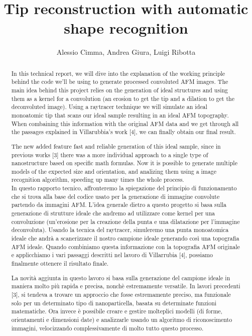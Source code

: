 \documentclass{article}
\author{Alessio Cimma, Andrea Giura, Luigi Ribotta}
\title{Tip reconstruction with automatic shape recognition}
\begin{document}
\maketitle

\newpage
\tableofcontents
\newpage


\begin{abstract}
    In this technical report, we will dive into the explanation of the working principle behind the code we'll be using to generate processed convoluted AFM images. The main idea behind this project relies on the generation of ideal structures and using them as a kernel for a convolution (an erosion to get the tip and a dilation to get the deconvoluted image). Using a raytracer technique we will simulate an ideal monoatomic tip that scans our ideal sample resulting in an ideal AFM topography. When combaining this information with the original AFM data and we get through all the passages explained in Villarubbia's work [4], we can finally obtain our final result.
    
    The new added feature fast and reliable generation of this ideal sample, since in previous works [3] there was a more individual approach to a single type of nanostructure based on specific math formulas. Now it is possible to generate multiple models of the expected size and orientation, and analizing them using a image recognition algorithm, speeding up many times the whole process.
    \\[1cm]
    In questo rapporto tecnico, affronteremo la spiegazione del principio di funzionamento che si trova alla base del codice usato per la generazione di immagine convolute partendo da immagini AFM. L'idea generale dietro a questo progetto si basa sulla generazione di strutture ideale che andremo ad utilizzare come kernel per una convoluzione (un'erosione per la creazione della punta e una dilatazione per l'immagine deconvoluta). Usando la tecnica del raytracer, simuleremo una punta monoatomica ideale che andrà a scanerizzare il nostro campione ideale generando così una topografia AFM ideale. Quando combiniamo questa informazione con la topografia AFM originale e applicchiamo i vari passaggi descritti nel lavoro di Villarrubia [4], possiamo finalmente ottenere il risultato finale.
    
    La novità aggiunta in questo lavoro si basa sulla generazione del campione ideale in maniera molto più rapida e precisa, nonchè estremamente versatile. In lavori precedenti [3], si tendeva a trovare un approccio che fosse estremamente preciso, ma funzionale solo per un determinato tipo di nanoparticella, basata su determinate funzioni matematiche. Ora invece è possibile creare e gestire molteplici modelli (di forme, orientamenti e dimensioni date) e analizzarle usando un algoritmo di riconoscimento immagini, velocizzando complessivamente di molto tutto questo processo. 
    
\end{abstract}
\end{document}
